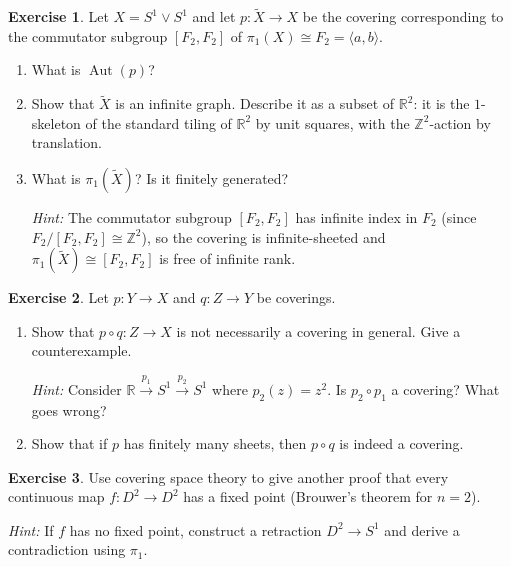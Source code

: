 \documentclass[12pt,a4paper,openany]{book}
\theoremstyle{definition}
\newtheorem{exercise}{Exercise}[chapter]
\theoremstyle{plain}
\theoremstyle{remark}
\newcommand{\Z}{\mathbb{Z}}
\newcommand{\R}{\mathbb{R}}
\DeclareMathOperator{\Aut}{Aut}
\begin{document}
\begin{exercise}\label{exo:cov-commutator}
  Let $X = S^1 \vee S^1$ and let $p\colon \widetilde{X} \to X$ be the
  covering corresponding to the commutator subgroup $[F_2, F_2]$ of
  $\pi_1(X) \cong F_2 = \langle a, b \rangle$.
  \begin{enumerate}[label=(\alph*)]
    \item What is $\Aut(p)$?
    \item Show that $\widetilde{X}$ is an infinite graph.  Describe it as a
      subset of $\R^2$: it is the $1$-skeleton of the standard tiling of
      $\R^2$ by unit squares, with the $\Z^2$-action by translation.
    \item What is $\pi_1(\widetilde{X})$?  Is it finitely generated?

      \textit{Hint:} The commutator subgroup $[F_2, F_2]$ has infinite index
      in $F_2$ (since $F_2 / [F_2, F_2] \cong \Z^2$), so the covering is
      infinite-sheeted and $\pi_1(\widetilde{X}) \cong [F_2, F_2]$ is free
      of infinite rank.
  \end{enumerate}
\end{exercise}

\begin{exercise}\label{exo:cov-composition}
  Let $p\colon Y \to X$ and $q\colon Z \to Y$ be coverings.
  \begin{enumerate}[label=(\alph*)]
    \item Show that $p \circ q\colon Z \to X$ is not necessarily a covering
      in general.  Give a counterexample.

      \textit{Hint:} Consider $\R \xrightarrow{p_1} S^1
      \xrightarrow{p_2} S^1$ where $p_2(z) = z^2$.  Is $p_2 \circ p_1$
      a covering?  What goes wrong?
    \item Show that if $p$ has finitely many sheets, then $p \circ q$ is
      indeed a covering.
  \end{enumerate}
\end{exercise}

\begin{exercise}\label{exo:cov-fixed-point}
  Use covering space theory to give another proof that every continuous map
  $f\colon D^2 \to D^2$ has a fixed point (Brouwer's theorem for $n = 2$).

  \textit{Hint:} If $f$ has no fixed point, construct a retraction
  $D^2 \to S^1$ and derive a contradiction using $\pi_1$.
\end{exercise}
\end{document}
